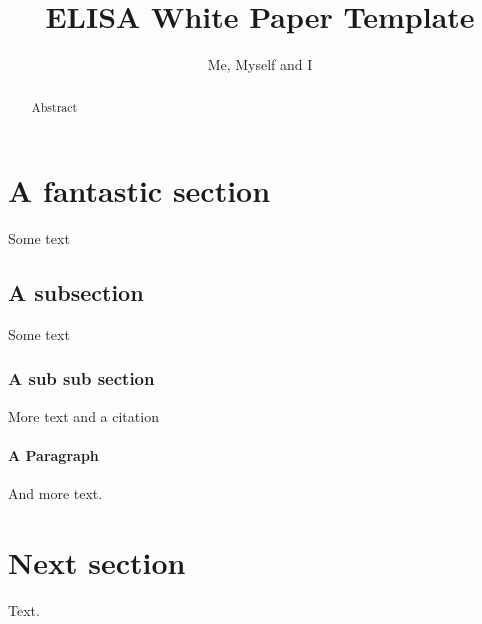 \documentclass[12pt]{ElisaPaper}
\title{ELISA White Paper Template}
\author{Me, Myself and I}
\begin{document}
	
\maketitle	
\begin{abstract}
Abstract
\end{abstract}

\tableofcontents

\section{A fantastic section}
Some text
\subsection{A subsection}
Some text

\subsubsection{A sub sub section}
More text and a citation \cite{ISO26262:2018}

\paragraph{A Paragraph}
And more text.

\section{Next section}
Text.
{}

	
\end{document}
